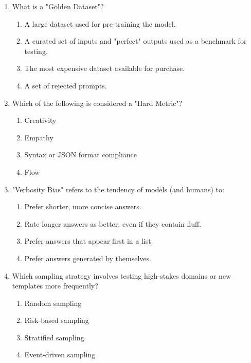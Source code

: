\documentclass[11pt,a4paper]{article}
\begin{document}
\begin{enumerate}[leftmargin=*, label=\textbf{\#\arabic*}]
  \item What is a "Golden Dataset"?\\
    \begin{enumerate}[label=\Alph*)]
      \item A large dataset used for pre-training the model.
      \item A curated set of inputs and "perfect" outputs used as a benchmark for testing.
      \item The most expensive dataset available for purchase.
      \item A set of rejected prompts.
    \end{enumerate}

  \item Which of the following is considered a "Hard Metric"?\\
    \begin{enumerate}[label=\Alph*)]
      \item Creativity
      \item Empathy
      \item Syntax or JSON format compliance
      \item Flow
    \end{enumerate}

  \item "Verbosity Bias" refers to the tendency of models (and humans) to:\\
    \begin{enumerate}[label=\Alph*)]
      \item Prefer shorter, more concise answers.
      \item Rate longer answers as better, even if they contain fluff.
      \item Prefer answers that appear first in a list.
      \item Prefer answers generated by themselves.
    \end{enumerate}

  \item Which sampling strategy involves testing high-stakes domains or new templates more frequently?\\
    \begin{enumerate}[label=\Alph*)]
      \item Random sampling
      \item Risk-based sampling
      \item Stratified sampling
      \item Event-driven sampling
    \end{enumerate}


\end{enumerate}
\end{document}
